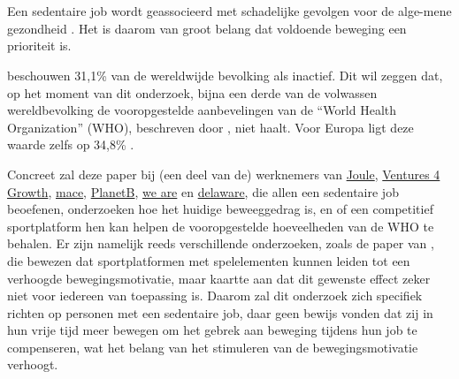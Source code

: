 
\chapter{}%
\label{ch:inleiding}


\section{}%
\label{sec:probleemstelling}

Een sedentaire job wordt geassocieerd met schadelijke gevolgen voor de alge-\linebreak mene gezondheid \autocite{Buckley2015}. Het is daarom van groot belang dat voldoende beweging een prioriteit is.

\textcite{Hallal2012} beschouwen 31,1\% van de wereldwijde bevolking als inactief. Dit wil zeggen dat, op het moment van dit onderzoek, bijna een derde van de volwassen wereldbevolking de vooropgestelde aanbevelingen van de ``World Health Organization'' (WHO), beschreven door \textcite{Bull2020}, niet haalt. Voor Europa ligt deze waarde zelfs op 34,8\% \autocite{Bull2020}.

Concreet zal deze paper bij (een deel van de) werknemers van \href{https://en.joule.be/}{Joule}, \href{https://www.ventures4growth.com/en}{Ventures 4 Growth}, \href{https://www.mace-legal.com/}{mace}, \href{https://planetb.life/en}{PlanetB}, \href{https://www.we-are.be/}{we are} en \href{https://www.delaware.pro/en-be}{delaware}, die allen een sedentaire job beoefenen, onderzoeken hoe het huidige beweeggedrag is, en of een competitief sportplatform hen kan helpen de vooropgestelde hoeveelheden van de WHO te behalen. Er zijn namelijk reeds verschillende onderzoeken, zoals de paper van \textcite{Kari2016}, die bewezen dat sportplatformen met spelelementen kunnen leiden tot een verhoogde bewegingsmotivatie, maar \textcite{Hamari2013a} kaartte aan dat dit gewenste effect zeker niet voor iedereen van toepassing is. Daarom zal dit onderzoek zich specifiek richten op personen met een sedentaire job, daar \textcite{Vandelanotte2015} geen bewijs vonden dat zij in hun vrije tijd meer bewegen om het gebrek aan beweging tijdens hun job te compenseren, wat het belang van het stimuleren van de bewegingsmotivatie verhoogt.

